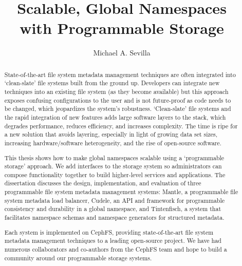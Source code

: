 \title{Scalable, Global Namespaces\\with Programmable Storage}
\author{Michael A. Sevilla}
\deanlinethree{}

\begin{frontmatter}
	\maketitle\copyrightpage\tableofcontents\listoffigures\listoftables
	\begin{abstract}

State-of-the-art file system metadata management techniques are often
integrated into `clean-slate' file systems built from the ground up. Developers
can integrate new techniques into an existing file system (as they become
available) but this approach exposes confusing configurations to the user and
is not future-proof as code needs to be changed, which jeopardizes the
system's robustness. `Clean-slate' file systems and the rapid integration of
new features adds large software layers to the stack, which degrades
performance, reduces efficiency, and increases complexity. The time is ripe for
a new solution that avoids layering, especially in light of growing data set
sizes, increasing hardware/software heterogeneity, and the rise of open-source
software.

This thesis shows how to make global namespaces scalable using a `programmable
storage' approach. We add interfaces to the storage system so administrators
can compose functionality together to build higher-level services and
applications. The dissertation discusses the design, implementation, and
evaluation of three programmable file system metadata management systems:
Mantle, a programmable file system metadata load balancer, Cudele, an API and
framework for programmable consistency and durability in a global namespace,
and Tintenfisch, a system that facilitates namespace schemas and namespace
generators for structured metadata.

Each system is implemented on CephFS, providing state-of-the-art file system
metadata management techniques to a leading open-source project. We have had
numerous collaborators and co-authors from the CephFS team and hope to build a
community around our programmable storage systems.


\end{abstract}
\end{frontmatter}
